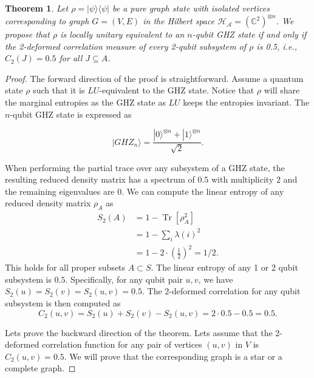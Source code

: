 \documentclass{article}
\newtheorem{theorem}{Theorem}
\DeclareMathOperator{\Tr}{Tr}
\newcommand{\ket}[1]{|#1\rangle}
\newcommand{\bra}[1]{\langle #1|}
\newcommand{\brackets}[1]{\left[ #1 \right]}
\newcommand{\trace}[1]{\Tr \brackets{ #1 }}
\begin{document}
\begin{theorem}
\label{thm:graph_strcuture_iff_2-entropy}
Let $\rho = \ket{\psi}\bra{\psi}$ be a pure graph state with isolated vertices corresponding to graph $G = (V, E)$ in the Hilbert space $\mathcal{H_A} = (\mathbb{C}^2)^{\otimes n}$. We propose that $\rho$ is locally unitary equivalent to an $n$-qubit GHZ state if and only if the 2-deformed correlation measure of every 2-qubit subsystem of $\rho$ is 0.5, i.e., $C_2(J) = 0.5$ for all $J \subseteq A$.
\end{theorem}
\begin{proof}
    The forward direction of the proof is straightforward. Assume a quantum state $\rho$ such that it is $LU$-equivalent to the GHZ state. Notice that $\rho$ will share the marginal entropies as the GHZ state as $LU$ keeps the entropies invariant. 
The $ n $-qubit GHZ state is expressed as


\begin{equation}
    \ket{GHZ_n} = \frac{\ket{0}^{\otimes n} + \ket{1}^{\otimes n}}{\sqrt{2}}.
\end{equation}



When performing the partial trace over any subsystem of a GHZ state, the resulting reduced density matrix has a spectrum of $0.5$ with multiplicity $2$ and the remaining eigenvalues are 0. We can compute the linear entropy of any reduced density matrix $\rho_A$ as 
\begin{align}
    S_2(A) &= 1 - \trace{\rho_A^2} \\
    &= 1 - \sum_{i} \lambda(i)^2 \\
    &= 1 - 2 \cdot \left(\frac{1}{2} \right)^2 = 1/2.
\end{align}
This holds for all proper subsets $ A \subset S $. The linear entropy of any 1 or 2 qubit subsystem is $ 0.5 $. Specifically, for any qubit pair $ u, v $, we have $ S_2(u) = S_2(v) = S_2(u, v) = 0.5 $. The 2-deformed correlation for any qubit subsystem is then computed as 
\begin{equation}
C_2(u, v) = S_2(u) + S_2(v) - S_2(u, v) = 2 \cdot 0.5 - 0.5 = 0.5.
\end{equation}

Lets prove the backward direction of the theorem. Lets assume that the 2-deformed correlation function for any pair of vertices $ (u, v) $ in $V$ is $ C_2(u, v) = 0.5 $. We will prove that the corresponding graph is a star or a complete graph.


\end{proof}
\end{document}
